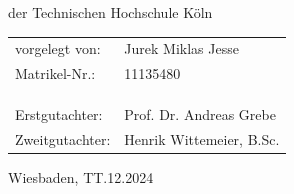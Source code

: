 \begin{titlepage}
    der Technischen Hochschule Köln
    \vfill
    \begin{tabular}{@{}ll}
        vorgelegt von:   & Jurek Miklas Jesse                             \\
        Matrikel-Nr.:    & 11135480                                       \\
        \\
        \\
        \\
        Erstgutachter: & Prof. Dr. Andreas Grebe                        \\
        Zweitgutachter:  & Henrik Wittemeier, B.Sc.
    \end{tabular}
    \vfill
    Wiesbaden, TT.12.2024%
    \rmfamily%
\end{titlepage}